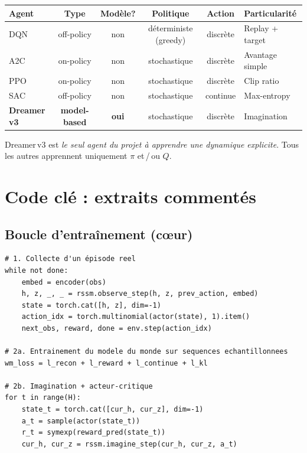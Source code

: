 \documentclass[11pt,a4paper]{article}
\newcommand{\dreamer}{Dreamer\,v3}
\begin{document}
\begin{center}
\begin{tabularx}{\linewidth}{lccccX}
\toprule
\textbf{Agent} & \textbf{Type} & \textbf{Modèle?} & \textbf{Politique} & \textbf{Action} & \textbf{Particularité} \\
\midrule
DQN     & off-policy & non & déterministe (greedy) & discrète & Replay + target \\
A2C     & on-policy  & non & stochastique          & discrète & Avantage simple \\
PPO     & on-policy  & non & stochastique          & discrète & Clip ratio \\
SAC     & off-policy & non & stochastique          & continue & Max-entropy \\
\textbf{\dreamer} & \textbf{model-based} & \textbf{oui} & stochastique & discrète & Imagination \\
\bottomrule
\end{tabularx}
\end{center}

\dreamer{} est \emph{le seul agent du projet à apprendre une dynamique
explicite}. Tous les autres apprennent uniquement \(\pi\) et\,/\,ou \(Q\).

\section{Code clé : extraits commentés}

\subsection{Boucle d'entraînement (cœur)}
\begin{lstlisting}
# 1. Collecte d'un épisode reel
while not done:
    embed = encoder(obs)
    h, z, _, _ = rssm.observe_step(h, z, prev_action, embed)
    state = torch.cat([h, z], dim=-1)
    action_idx = torch.multinomial(actor(state), 1).item()
    next_obs, reward, done = env.step(action_idx)

# 2a. Entrainement du modele du monde sur sequences echantillonnees
wm_loss = l_recon + l_reward + l_continue + l_kl

# 2b. Imagination + acteur-critique
for t in range(H):
    state_t = torch.cat([cur_h, cur_z], dim=-1)
    a_t = sample(actor(state_t))
    r_t = symexp(reward_pred(state_t))
    cur_h, cur_z = rssm.imagine_step(cur_h, cur_z, a_t)
\end{lstlisting}
\end{document}
